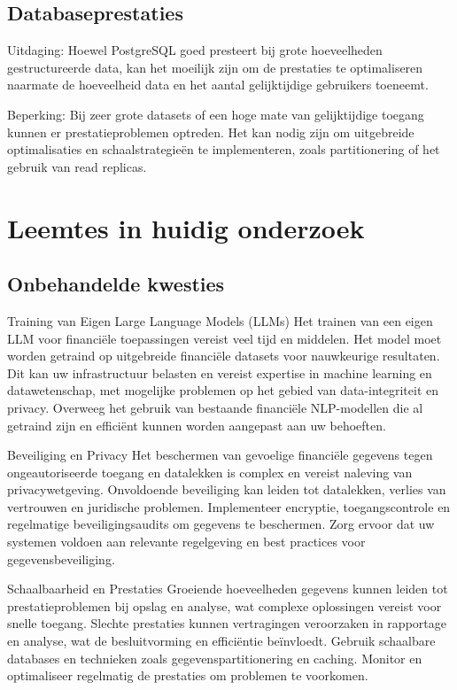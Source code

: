 \subsection{Databaseprestaties}
Uitdaging: Hoewel PostgreSQL goed presteert bij grote hoeveelheden gestructureerde data, kan het moeilijk zijn om de prestaties te optimaliseren naarmate de hoeveelheid data en het aantal gelijktijdige gebruikers toeneemt.

Beperking: Bij zeer grote datasets of een hoge mate van gelijktijdige toegang kunnen er prestatieproblemen optreden. Het kan nodig zijn om uitgebreide optimalisaties en schaalstrategieën te implementeren, zoals partitionering of het gebruik van read replicas.
\section{Leemtes in huidig onderzoek}
\subsection{Onbehandelde kwesties}
Training van Eigen Large Language Models (LLMs)
Het trainen van een eigen LLM voor financiële toepassingen vereist veel tijd en middelen. Het model moet worden getraind op uitgebreide financiële datasets voor nauwkeurige resultaten. Dit kan uw infrastructuur belasten en vereist expertise in machine learning en datawetenschap, met mogelijke problemen op het gebied van data-integriteit en privacy. Overweeg het gebruik van bestaande financiële NLP-modellen die al getraind zijn en efficiënt kunnen worden aangepast aan uw behoeften.

Beveiliging en Privacy
Het beschermen van gevoelige financiële gegevens tegen ongeautoriseerde toegang en datalekken is complex en vereist naleving van privacywetgeving. Onvoldoende beveiliging kan leiden tot datalekken, verlies van vertrouwen en juridische problemen. Implementeer encryptie, toegangscontrole en regelmatige beveiligingsaudits om gegevens te beschermen. Zorg ervoor dat uw systemen voldoen aan relevante regelgeving en best practices voor gegevensbeveiliging.

Schaalbaarheid en Prestaties
Groeiende hoeveelheden gegevens kunnen leiden tot prestatieproblemen bij opslag en analyse, wat complexe oplossingen vereist voor snelle toegang. Slechte prestaties kunnen vertragingen veroorzaken in rapportage en analyse, wat de besluitvorming en efficiëntie beïnvloedt. Gebruik schaalbare databases en technieken zoals gegevenspartitionering en caching. Monitor en optimaliseer regelmatig de prestaties om problemen te voorkomen.

